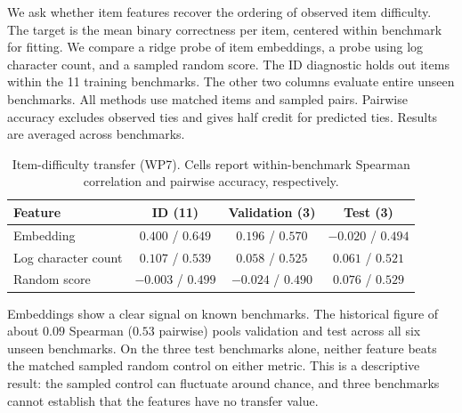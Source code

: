 \label{sec:item-difficulty-transfer}
We ask whether item features recover the ordering of observed item
difficulty. The target is the mean binary correctness per item, centered
within benchmark for fitting. We compare a ridge probe of item embeddings,
a probe using log character count, and a sampled random score. The ID
diagnostic holds out items within the 11 training benchmarks. The other
two columns evaluate entire unseen benchmarks. All methods use matched
items and sampled pairs. Pairwise accuracy excludes observed ties and
gives half credit for predicted ties. Results are averaged across benchmarks.

\begin{table}[t]
\centering
\caption{Item-difficulty transfer (WP7). Cells report within-benchmark
Spearman correlation and pairwise accuracy, respectively.}
\label{tab:item-difficulty}
\begin{tabular}{lccc}
\toprule
Feature & ID (11) & Validation (3) & Test (3)\\
\midrule
Embedding & $0.400$ / $0.649$ & $0.196$ / $0.570$ & $-0.020$ / $0.494$\\
Log character count & $0.107$ / $0.539$ & $0.058$ / $0.525$ & $0.061$ / $0.521$\\
Random score & $-0.003$ / $0.499$ & $-0.024$ / $0.490$ & $0.076$ / $0.529$\\
\bottomrule
\end{tabular}
\end{table}

Embeddings show a clear signal on known benchmarks. The historical figure
of about $0.09$ Spearman ($0.53$ pairwise) pools validation and test across
all six unseen benchmarks. On the three test benchmarks alone, neither
feature beats the matched sampled random control on either metric.
This is a descriptive result: the sampled control can fluctuate around
chance, and three benchmarks cannot establish that the features have no
transfer value.

